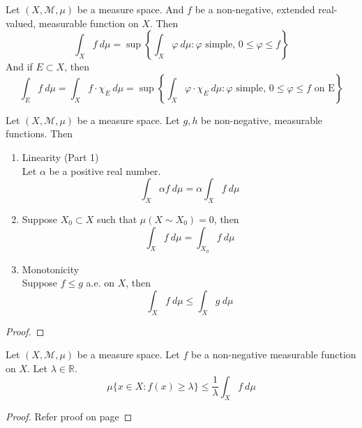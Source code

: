\begin{definition}
	Let $(X,\mathcal{M},\mu)$ be a measure space.
	And $f$ be a non-negative, extended real-valued, measurable function on $X$.
	Then
	\begin{equation}
		\int_X f \ d\mu = \sup \left\{ \int_X \varphi \ d\mu : \varphi \text{ simple, } 0 \le \varphi \le f \right\}
	\end{equation}
	And if $E \subset X$, then
	\begin{equation}
		\int_E f \ d\mu = \int_X f \cdot \chi_E \ d\mu = \sup \left\{ \int_X \varphi \cdot \chi_E \ d\mu : \varphi \text{ simple, } 0 \le \varphi \le f \text{ on E} \right\}
	\end{equation}
\end{definition}
\begin{theorem}
	Let $(X,\mathcal{M},\mu)$ be a measure space.
	Let $g,h$ be non-negative, measurable functions.
	Then
	\begin{enumerate}
		\item Linearity (Part 1)\\
			Let $\alpha$ be a positive real number.
			\begin{equation}
				 \int_X \alpha f \ d\mu = \alpha \int_X f \ d\mu
			\end{equation}
		\item Suppose $X_0 \subset X$ such that $\mu(X \sim X_0) = 0$, then
			\begin{equation}
				\int_X f \ d\mu = \int_{X_0} f \ d\mu
			\end{equation}
		\item Monotonicity \\
			Suppose $f \le g$ a.e. on $X$, then
			\begin{equation}
				\int_X f \ d\mu \le \int_X g \ d\mu
			\end{equation}
	\end{enumerate}
\end{theorem}
\begin{proof}
\end{proof}

\begin{theorem}
	Let $(X,\mathcal{M},\mu)$ be a measure space.
	Let $f$ be a non-negative measurable function on $X$.
	Let $\lambda \in \mathbb{R}$.
	\[ \mu \{ x \in X : f(x) \ge \lambda \} \le \frac{1}{\lambda} \int_X f \ d\mu \]
\end{theorem}
\begin{proof}
	Refer proof on page \pageref{thm:chebychev}
\end{proof}


